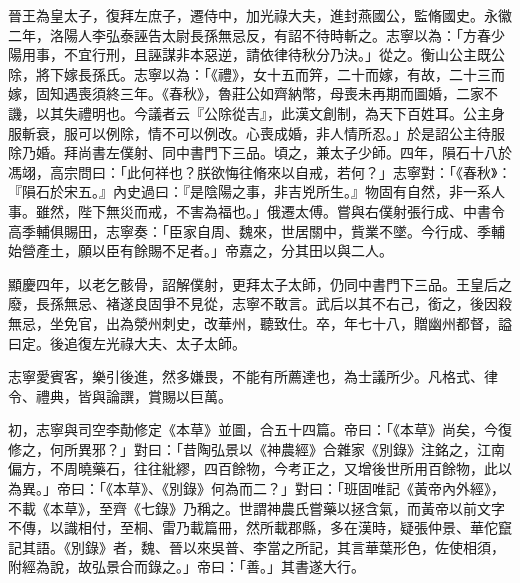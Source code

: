 \begin{pinyinscope}
 晉王為皇太子，復拜左庶子，遷侍中，加光祿大夫，進封燕國公，監脩國史。永徽二年，洛陽人李弘泰誣告太尉長孫無忌反，有詔不待時斬之。志寧以為：「方春少陽用事，不宜行刑，且誣謀非本惡逆，請依律待秋分乃決。」從之。衡山公主既公除，將下嫁長孫氏。志寧以為：「《禮》，女十五而笄，二十而嫁，有故，二十三而嫁，固知遇喪須終三年。《春秋》，魯莊公如齊納幣，母喪未再期而圖婚，二家不譏，以其失禮明也。今議者云『公除從吉』，此漢文創制，為天下百姓耳。公主身服斬衰，服可以例除，情不可以例改。心喪成婚，非人情所忍。」於是詔公主待服除乃婚。拜尚書左僕射、同中書門下三品。頃之，兼太子少師。四年，隕石十八於馮翊，高宗問曰：「此何祥也？朕欲悔往脩來以自戒，若何？」志寧對：「《春秋》：『隕石於宋五。』內史過曰：『是陰陽之事，非吉兇所生。』物固有自然，非一系人事。雖然，陛下無災而戒，不害為福也。」俄遷太傅。嘗與右僕射張行成、中書令高季輔俱賜田，志寧奏：「臣家自周、魏來，世居關中，貲業不墜。今行成、季輔始營產土，願以臣有餘賜不足者。」帝嘉之，分其田以與二人。



 顯慶四年，以老乞骸骨，詔解僕射，更拜太子太師，仍同中書門下三品。王皇后之廢，長孫無忌、褚遂良固爭不見從，志寧不敢言。武后以其不右己，銜之，後因殺無忌，坐免官，出為滎州刺史，改華州，聽致仕。卒，年七十八，贈幽州都督，謚曰定。後追復左光祿大夫、太子太師。



 志寧愛賓客，樂引後進，然多嫌畏，不能有所薦達也，為士議所少。凡格式、律令、禮典，皆與論譔，賞賜以巨萬。



 初，志寧與司空李勣修定《本草》並圖，合五十四篇。帝曰：「《本草》尚矣，今復修之，何所異邪？」對曰：「昔陶弘景以《神農經》合雜家《別錄》注銘之，江南偏方，不周曉藥石，往往紕繆，四百餘物，今考正之，又增後世所用百餘物，此以為異。」帝曰：「《本草》、《別錄》何為而二？」對曰：「班固唯記《黃帝內外經》，不載《本草》，至齊《七錄》乃稱之。世謂神農氏嘗藥以拯含氣，而黃帝以前文字不傳，以識相付，至桐、雷乃載篇冊，然所載郡縣，多在漢時，疑張仲景、華佗竄記其語。《別錄》者，魏、晉以來吳普、李當之所記，其言華葉形色，佐使相須，附經為說，故弘景合而錄之。」帝曰：「善。」其書遂大行。




\end{pinyinscope}
